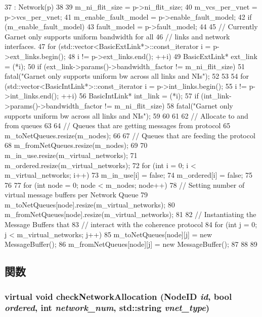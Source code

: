 \begin{DoxyCode}
37     : Network(p)
38 {
39     m_ni_flit_size = p->ni_flit_size;
40     m_vcs_per_vnet = p->vcs_per_vnet;
41     m_enable_fault_model = p->enable_fault_model;
42     if (m_enable_fault_model)
43         fault_model = p->fault_model;
44 
45     // Currently Garnet only supports uniform bandwidth for all
46     // links and network interfaces.
47     for (std::vector<BasicExtLink*>::const_iterator i = p->ext_links.begin();
48          i != p->ext_links.end(); ++i) {
49         BasicExtLink* ext_link = (*i);
50         if (ext_link->params()->bandwidth_factor != m_ni_flit_size) {
51             fatal("Garnet only supports uniform bw across all links and NIs\n");
52         }
53     }
54     for (std::vector<BasicIntLink*>::const_iterator i =  p->int_links.begin();
55          i != p->int_links.end(); ++i) {
56         BasicIntLink* int_link = (*i);
57         if (int_link->params()->bandwidth_factor != m_ni_flit_size) {
58             fatal("Garnet only supports uniform bw across all links and NIs\n");
59         }
60     }
61 
62     // Allocate to and from queues
63 
64     // Queues that are getting messages from protocol
65     m_toNetQueues.resize(m_nodes);
66 
67     // Queues that are feeding the protocol
68     m_fromNetQueues.resize(m_nodes);
69 
70     m_in_use.resize(m_virtual_networks);
71     m_ordered.resize(m_virtual_networks);
72     for (int i = 0; i < m_virtual_networks; i++) {
73         m_in_use[i] = false;
74         m_ordered[i] = false;
75     }
76 
77     for (int node = 0; node < m_nodes; node++) {
78         // Setting number of virtual message buffers per Network Queue
79         m_toNetQueues[node].resize(m_virtual_networks);
80         m_fromNetQueues[node].resize(m_virtual_networks);
81 
82         // Instantiating the Message Buffers that
83         // interact with the coherence protocol
84         for (int j = 0; j < m_virtual_networks; j++) {
85             m_toNetQueues[node][j] = new MessageBuffer();
86             m_fromNetQueues[node][j] = new MessageBuffer();
87         }
88     }
89 }
\end{DoxyCode}


\subsection{関数}
\hypertarget{classBaseGarnetNetwork_a17adbaf838763d6fd04e9dbf53536b15}{
\subsubsection[{checkNetworkAllocation}]{\setlength{\rightskip}{0pt plus 5cm}virtual void checkNetworkAllocation ({\bf NodeID} {\em id}, \/  bool {\em ordered}, \/  int {\em network\_\-num}, \/  std::string {\em vnet\_\-type})}}
\label{classBaseGarnetNetwork_a17adbaf838763d6fd04e9dbf53536b15}


